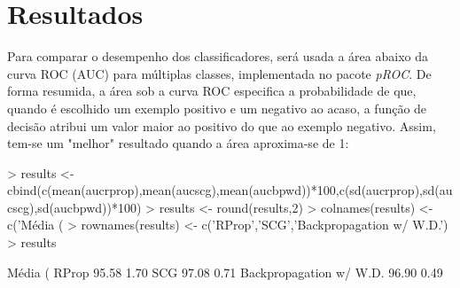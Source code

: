 \documentclass{article}
\begin{document}
\section{Resultados}
Para comparar o desempenho dos classificadores, será usada a área abaixo da curva ROC (AUC) para múltiplas classes, implementada no pacote \textit{pROC}. De forma resumida, a área sob a curva ROC especifica a probabilidade de que, quando é escolhido um exemplo positivo e um negativo ao acaso, a função de decisão atribui um valor maior ao positivo do que ao exemplo negativo. Assim, tem-se um "melhor" resultado quando a área aproxima-se de 1:
\begin{Schunk}
\begin{Sinput}
> results <- cbind(c(mean(aucrprop),mean(aucscg),mean(aucbpwd))*100,c(sd(aucrprop),sd(aucscg),sd(aucbpwd))*100)
> results <- round(results,2)
> colnames(results) <- c('Média (%)','Std. (%)')
> rownames(results) <- c('RProp','SCG','Backpropagation w/ W.D.')
> results
\end{Sinput}
\begin{Soutput}
                        Média (%) Std. (%)
RProp                       95.58     1.70
SCG                         97.08     0.71
Backpropagation w/ W.D.     96.90     0.49
\end{Soutput}
\end{Schunk}
\end{document}
